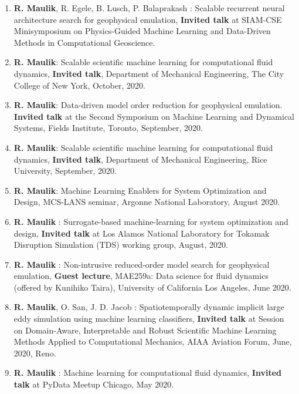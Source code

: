 \documentclass[letterpaper]{article}
\begin{document}
\begin{enumerate}

\item \textbf{R. Maulik}, R. Egele, B. Lusch, P. Balaprakash : Scalable recurrent neural architecture search for geophysical emulation, \textbf{Invited talk} at SIAM-CSE Minisymposium on Physics-Guided Machine Learning and Data-Driven Methods in Computational Geoscience.

\item \textbf{R. Maulik}: Scalable scientific machine learning for computational fluid dynamics, \textbf{Invited talk}, Department of Mechanical Engineering, The City College of New York, October, 2020.

\item \textbf{R. Maulik}: Data-driven model order reduction for geophysical emulation. \textbf{Invited talk} at the Second Symposium on Machine Learning and Dynamical Systems, Fields Institute, Toronto, September, 2020.

\item \textbf{R. Maulik}: Scalable scientific machine learning for computational fluid dynamics, \textbf{Invited talk}, Department of Mechanical Engineering, Rice University, September, 2020.

\item \textbf{R. Maulik}: Machine Learning Enablers for System Optimization and Design, MCS-LANS seminar, Argonne National Laboratory, August 2020.

\item \textbf{R. Maulik} : Surrogate-based machine-learning for system optimization and design, \textbf{Invited talk} at Los Alamos National Laboratory for Tokamak Disruption Simulation (TDS) working group, August, 2020.

\item \textbf{R. Maulik} : Non-intrusive reduced-order model search for geophysical emulation, \textbf{Guest lecture}, MAE259a: Data science for fluid dynamics (offered by Kunihiko Taira), University of California Los Angeles, June 2020.

\item \textbf{R. Maulik}, O. San, J. D. Jacob : Spatiotemporally dynamic implicit large eddy simulation using machine learning classifiers, \textbf{Invited talk} at Session on Domain-Aware, Interpretable and Robust Scientific Machine Learning Methods Applied to Computational Mechanics, AIAA Aviation Forum, June, 2020, Reno. 

\item \textbf{R. Maulik} : Machine learning for computational fluid dynamics, \textbf{Invited talk} at PyData Meetup Chicago, May 2020.


\end{enumerate}
\end{document}
